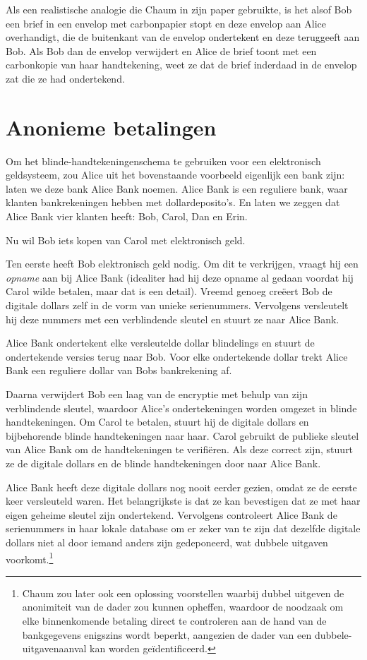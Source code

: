 \documentclass[
  a5paper,
  smalldemyvopaper,11pt,twoside,onecolumn,openright,extrafontsizes,
hidelinks]{memoir}
\begin{document}
Als een realistische analogie die Chaum in zijn paper gebruikte, is het
alsof Bob een brief in een envelop met carbonpapier stopt en deze
envelop aan Alice overhandigt, die de buitenkant van de envelop
ondertekent en deze teruggeeft aan Bob. Als Bob dan de envelop
verwijdert en Alice de brief toont met een carbonkopie van haar
handtekening, weet ze dat de brief inderdaad in de envelop zat die ze
had ondertekend.

\section{Anonieme betalingen}\label{anonieme-betalingen}

Om het blinde-handtekeningenschema te gebruiken voor een elektronisch
geldsysteem, zou Alice uit het bovenstaande voorbeeld eigenlijk een bank
zijn: laten we deze bank Alice Bank noemen. Alice Bank is een reguliere
bank, waar klanten bankrekeningen hebben met dollardeposito's. En laten
we zeggen dat Alice Bank vier klanten heeft: Bob, Carol, Dan en Erin.

Nu wil Bob iets kopen van Carol met elektronisch geld.

Ten eerste heeft Bob elektronisch geld nodig. Om dit te verkrijgen,
vraagt hij een \emph{opname} aan bij Alice Bank (idealiter had hij deze
opname al gedaan voordat hij Carol wilde betalen, maar dat is een
detail). Vreemd genoeg creëert Bob de digitale dollars zelf in de vorm
van unieke serienummers. Vervolgens versleutelt hij deze nummers met een
verblindende sleutel en stuurt ze naar Alice Bank.

Alice Bank ondertekent elke versleutelde dollar blindelings en stuurt de
ondertekende versies terug naar Bob. Voor elke ondertekende dollar trekt
Alice Bank een reguliere dollar van Bobs bankrekening af.

Daarna verwijdert Bob een laag van de encryptie met behulp van zijn
verblindende sleutel, waardoor Alice's ondertekeningen worden omgezet in
blinde handtekeningen. Om Carol te betalen, stuurt hij de digitale
dollars en bijbehorende blinde handtekeningen naar haar. Carol gebruikt
de publieke sleutel van Alice Bank om de handtekeningen te verifiëren.
Als deze correct zijn, stuurt ze de digitale dollars en de blinde
handtekeningen door naar Alice Bank.

Alice Bank heeft deze digitale dollars nog nooit eerder gezien, omdat ze
de eerste keer versleuteld waren. Het belangrijkste is dat ze kan
bevestigen dat ze met haar eigen geheime sleutel zijn ondertekend.
Vervolgens controleert Alice Bank de serienummers in haar lokale
database om er zeker van te zijn dat dezelfde digitale dollars niet al
door iemand anders zijn gedeponeerd, wat dubbele uitgaven
voorkomt.\footnote{Chaum zou later ook een oplossing voorstellen waarbij
  dubbel uitgeven de anonimiteit van de dader zou kunnen opheffen,
  waardoor de noodzaak om elke binnenkomende betaling direct te
  controleren aan de hand van de bankgegevens enigszins wordt beperkt,
  aangezien de dader van een dubbele-uitgavenaanval kan worden
  geïdentificeerd.}
\end{document}
